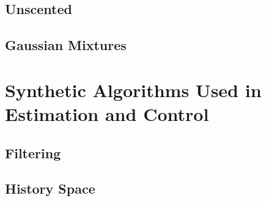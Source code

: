 \subsection{Unscented}
\subsection{Gaussian Mixtures}

\section{Synthetic Algorithms Used in Estimation and Control}
\subsection{Filtering}
\subsection{History Space}

